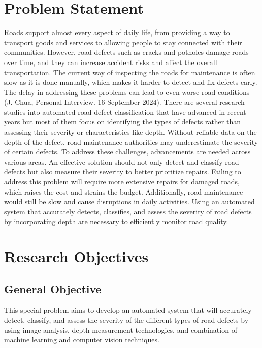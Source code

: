 \documentclass{report} %
\begin{document}
	\section{Problem Statement}
	Roads support almost every aspect of daily life, from providing a way to transport goods and services to allowing people to stay connected with their communities. However, road defects such as cracks and potholes damage roads over time, and they can increase accident risks and affect the overall transportation. The current way of inspecting the roads for maintenance is often slow as it is done manually, which makes it harder to detect and fix defects early. The delay in addressing these problems can lead to even worse road conditions (J. Chua, Personal Interview. 16 September 2024). There are several research studies into automated road defect classification that have advanced in recent years but most of them focus on identifying the types of defects rather than assessing their severity or characteristics like depth. Without reliable data on the depth of the defect, road maintenance authorities may underestimate the severity of certain defects. To address these challenges, advancements are needed across various areas. An effective solution should not only detect and classify road defects but also measure their severity to better prioritize repairs. Failing to address this problem will require more extensive repairs for damaged roads, which raises the cost and strains the budget. Additionally, road maintenance would still be slow and cause disruptions in daily activities. Using an automated system that accurately detects, classifies, and assess the severity of road defects by incorporating depth are necessary to efficiently monitor road quality.
	
	
	\section{Research Objectives}
	\label{sec:researchobjectives}
	
	\subsection{General Objective}
	\label{sec:generalobjective}
	
	This special problem aims to develop an automated system that will accurately detect, classify, and assess the severity of the different types of road defects by using image analysis, depth measurement technologies, and combination of machine learning and computer vision techniques. 
	
\end{document}
